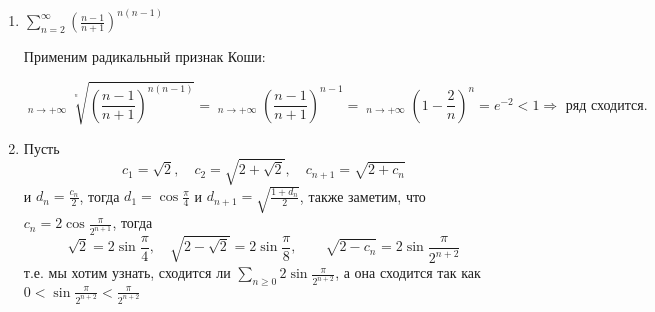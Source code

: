\documentclass[11pt]{article}
\DeclareMathOperator*\uplim{\overline{lim}}
\begin{document}
\begin{enumerate}
\begin{enumerate}
			\item $\sum_{n=2}^{\infty} (\frac{n-1}{n+1})^{n(n-1)}$
			
			Применим радикальный признак Коши:
			
			$$ 
			\uplim_{n \to +\infty} \sqrt[^n]{\left(\frac{n-1}{n+1} \right) ^{n(n-1)}} =
			\uplim_{n \to +\infty} \left( \frac{n-1}{n+1} \right)^{n-1} = 
			\uplim_{n \to +\infty} \left( 1 - \frac{2}{n} \right)^n =
			e^{-2} < 1 \Rightarrow \text{ ряд сходится.}$$
			\item Пусть $$c_1=\sqrt{2},\quad c_2=\sqrt{2+\sqrt{2}},\quad c_{n+1}=\sqrt{2+c_n}$$
			и $d_n=\frac{c_n}{2}$, тогда $d_1=\cos{\frac{\pi}{4}}$ и $d_{n+1}=\sqrt{\frac{1+d_n}{2}}$, также заметим, что $c_n=2\cos{\frac{\pi}{2^{n+1}}}$, тогда
			$$\sqrt{2} = 2\sin\frac{\pi}{4},\quad \sqrt{2-\sqrt{2}}=2\sin\frac{\pi}{8},\qquad \sqrt{2-c_n} =  2\sin\frac{\pi}{2^{n+2}}$$
			т.е. мы хотим узнать, сходится ли $\sum_{n\geq 0}2\sin\frac{\pi}{2^{n+2}}$, а она сходится так как $0<\sin\frac{\pi}{2^{n+2}}<\frac{\pi}{2^{n+2}}$
		\end{enumerate}
		
		
	\end{enumerate}
\end{document}
